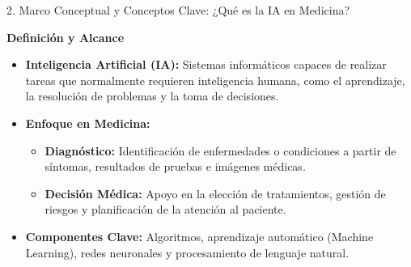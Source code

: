 \documentclass[aspectratio=169]{beamer}
\begin{document}
\begin{frame}[fragile]{2. Marco Conceptual y Conceptos Clave: ¿Qué es la IA en Medicina?}


\textbf{Definición y Alcance}
\begin{itemize}
  \item \textbf{Inteligencia Artificial (IA):} Sistemas informáticos capaces de realizar tareas que normalmente requieren inteligencia humana, como el aprendizaje, la resolución de problemas y la toma de decisiones.
  \item \textbf{Enfoque en Medicina:}
  \begin{itemize}
    \item \textbf{Diagnóstico:} Identificación de enfermedades o condiciones a partir de síntomas, resultados de pruebas e imágenes médicas.
    \item \textbf{Decisión Médica:} Apoyo en la elección de tratamientos, gestión de riesgos y planificación de la atención al paciente.
  \end{itemize}
  \item \textbf{Componentes Clave:} Algoritmos, aprendizaje automático (Machine Learning), redes neuronales y procesamiento de lenguaje natural.
\end{itemize}
\end{frame}
\end{document}
